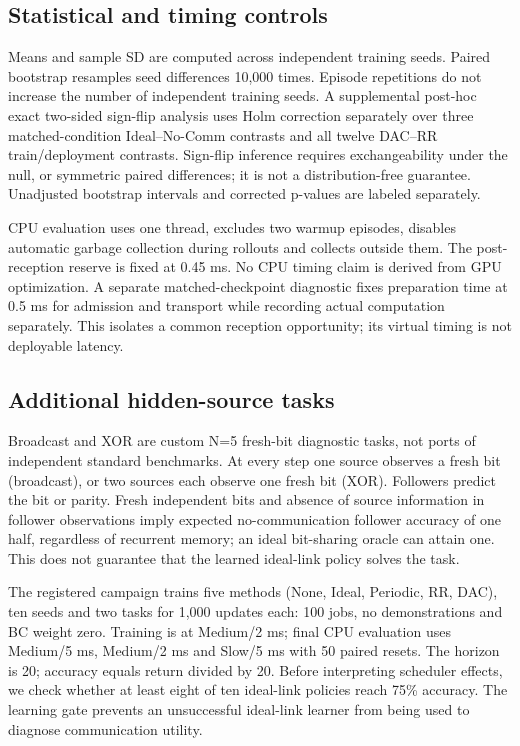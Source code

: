 \documentclass[10pt]{article}
\begin{document}
\subsection{Statistical and timing controls}
Means and sample SD are computed across independent training seeds. Paired bootstrap resamples seed differences 10,000 times. Episode repetitions do not increase the number of independent training seeds. A supplemental post-hoc exact two-sided sign-flip analysis uses Holm correction separately over three matched-condition Ideal--No-Comm contrasts and all twelve DAC--RR train/deployment contrasts. Sign-flip inference requires exchangeability under the null, or symmetric paired differences; it is not a distribution-free guarantee. Unadjusted bootstrap intervals and corrected p-values are labeled separately.

CPU evaluation uses one thread, excludes two warmup episodes, disables automatic garbage collection during rollouts and collects outside them. The post-reception reserve is fixed at 0.45 ms. No CPU timing claim is derived from GPU optimization. A separate matched-checkpoint diagnostic fixes preparation time at 0.5 ms for admission and transport while recording actual computation separately. This isolates a common reception opportunity; its virtual timing is not deployable latency.

\subsection{Additional hidden-source tasks}
Broadcast and XOR are custom N=5 fresh-bit diagnostic tasks, not ports of independent standard benchmarks. At every step one source observes a fresh bit (broadcast), or two sources each observe one fresh bit (XOR). Followers predict the bit or parity. Fresh independent bits and absence of source information in follower observations imply expected no-communication follower accuracy of one half, regardless of recurrent memory; an ideal bit-sharing oracle can attain one. This does not guarantee that the learned ideal-link policy solves the task.

The registered campaign trains five methods (None, Ideal, Periodic, RR, DAC), ten seeds and two tasks for 1,000 updates each: 100 jobs, no demonstrations and BC weight zero. Training is at Medium/2 ms; final CPU evaluation uses Medium/5 ms, Medium/2 ms and Slow/5 ms with 50 paired resets. The horizon is 20; accuracy equals return divided by 20. Before interpreting scheduler effects, we check whether at least eight of ten ideal-link policies reach 75\% accuracy. The learning gate prevents an unsuccessful ideal-link learner from being used to diagnose communication utility.
\end{document}
